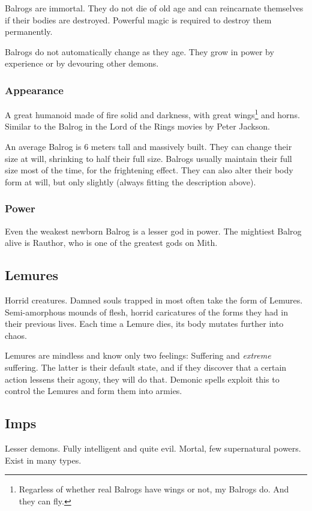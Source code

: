 Balrogs are immortal. They do not die of old age and can reincarnate themselves if their bodies are destroyed. Powerful magic is required to destroy them permanently. 

Balrogs do not automatically change as they age. They grow in power by experience or by devouring other demons.

\subsubsection{Appearance}
A great humanoid made of fire solid and darkness, with great wings\footnote{Regarless of whether real Balrogs have wings or not, my Balrogs do. And they can fly.} and horns. Similar to the Balrog in the Lord of the Rings movies by Peter Jackson. 

An average Balrog is 6 meters tall and massively built. They can change their size at will, shrinking to half their full size. Balrogs usually maintain their full size most of the time, for the frightening effect. They can also alter their body form at will, but only slightly (always fitting the description above). 

\subsubsection{Power}
Even the weakest newborn Balrog is a lesser god in power. The mightiest Balrog alive is Rauthor, who is one of the greatest gods on Mith. 



\subsection{Lemures}
Horrid creatures. Damned souls trapped in \Tuat{} most often take the form of Lemures. Semi-amorphous mounds of flesh, horrid caricatures of the forms they had in their previous lives. Each time a Lemure dies, its body mutates further into chaos. 

Lemures are mindless and know only two feelings: Suffering and \emph{extreme} suffering. The latter is their default state, and if they discover that a certain action lessens their agony, they will do that. Demonic spells exploit this to control the Lemures and form them into armies. 



\subsection{Imps}
Lesser demons. Fully intelligent and quite evil. Mortal, few supernatural powers. Exist in many types. 



